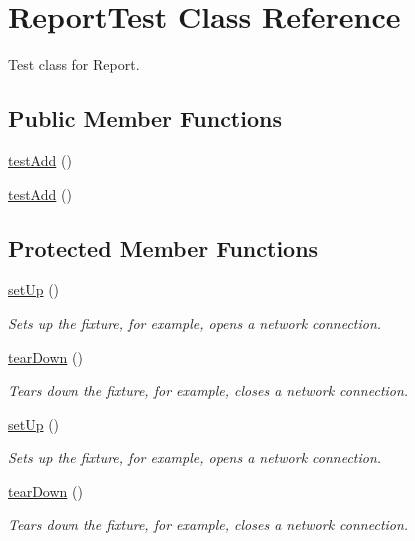 \hypertarget{class_report_test}{
\section{ReportTest Class Reference}
\label{class_report_test}
}


Test class for Report.  


\subsection*{Public Member Functions}
\begin{DoxyCompactItemize}
\item 
\hyperlink{class_report_test_afbad58fdd016e59dc660f42cf018daa1}{testAdd} ()
\item 
\hyperlink{class_report_test_afbad58fdd016e59dc660f42cf018daa1}{testAdd} ()
\end{DoxyCompactItemize}
\subsection*{Protected Member Functions}
\begin{DoxyCompactItemize}
\item 
\hyperlink{class_report_test_ae8b2e97ce7a79fdf8a9b90f0d0edbd04}{setUp} ()
\begin{DoxyCompactList}\small\item\em Sets up the fixture, for example, opens a network connection. \item\end{DoxyCompactList}\item 
\hyperlink{class_report_test_aab8be0ff8514fc42d2c93b6b18bf24d6}{tearDown} ()
\begin{DoxyCompactList}\small\item\em Tears down the fixture, for example, closes a network connection. \item\end{DoxyCompactList}\item 
\hyperlink{class_report_test_ae8b2e97ce7a79fdf8a9b90f0d0edbd04}{setUp} ()
\begin{DoxyCompactList}\small\item\em Sets up the fixture, for example, opens a network connection. \item\end{DoxyCompactList}\item 
\hyperlink{class_report_test_aab8be0ff8514fc42d2c93b6b18bf24d6}{tearDown} ()
\begin{DoxyCompactList}\small\item\em Tears down the fixture, for example, closes a network connection. \item\end{DoxyCompactList}\end{DoxyCompactItemize}
